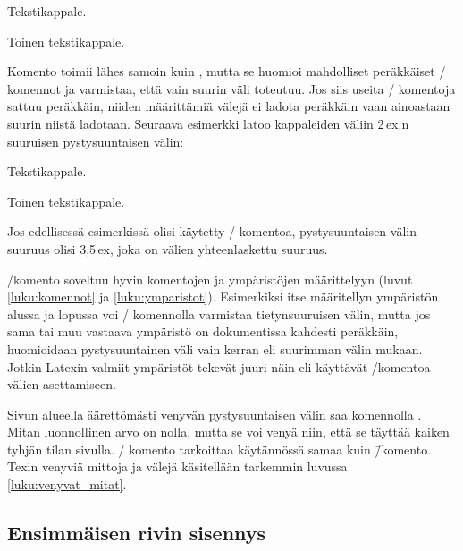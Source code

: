 \begin{koodilohkosis}
Tekstikappale.
\vspace{5ex plus 1ex minus .5ex}

Toinen tekstikappale.
\end{koodilohkosis}

Komento  toimii lähes samoin kuin ,
mutta se huomioi mahdolliset peräkkäiset \-/ komennot
ja varmistaa, että vain suurin väli toteutuu. Jos siis useita
\-/ komentoja sattuu peräkkäin, niiden määrittämiä
välejä ei ladota peräkkäin vaan ainoastaan suurin niistä ladotaan.
Seuraava esimerkki latoo kappaleiden väliin 2\,ex:n suuruisen
pystysuuntaisen välin:

\begin{koodilohkosis}
Tekstikappale.

\addvspace{1ex} \addvspace{2ex} \addvspace{.5ex}
Toinen tekstikappale.
\end{koodilohkosis}

Jos edellisessä esimerkissä olisi käytetty \-/ komentoa,
pystysuuntaisen välin suuruus olisi 3,5\,ex, joka on välien
yhteenlaskettu suuruus.

\-/komento soveltuu hyvin komentojen ja ympäristöjen
määrittelyyn (luvut \ref{luku:komennot} ja \ref{luku:ymparistot}).
Esimerkiksi itse määritellyn ympäristön alussa ja lopussa voi
\-/ komennolla varmistaa tietynsuuruisen välin, mutta
jos sama tai muu vastaava ympäristö on dokumentissa kahdesti peräkkäin,
huomioidaan pystysuuntainen väli vain kerran eli suurimman välin mukaan.
Jotkin Latexin valmiit ympäristöt tekevät juuri näin eli käyttävät
\-/komentoa välien asettamiseen.

Sivun alueella äärettömästi venyvän pystysuuntaisen välin saa komennolla
. Mitan luonnollinen arvo on nolla, mutta se voi venyä
niin, että se täyttää kaiken tyhjän tilan sivulla. \-/
komento tarkoittaa käytännössä samaa kuin  \=/komento. Texin venyviä mittoja ja välejä käsitellään
tarkemmin luvussa \ref{luku:venyvat_mitat}.

\subsection{Ensimmäisen rivin sisennys}
\label{luku:ensimmaisen_rivin_sisennys}

